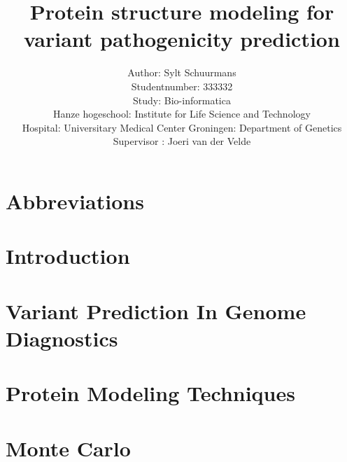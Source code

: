 \documentclass[10pt]{article}
\begin{document}
	\title{Protein structure modeling for variant pathogenicity prediction}
	\author{Author: Sylt Schuurmans\\
		Studentnumber: 333332\\
		Study: Bio-informatica\\
		Hanze hogeschool: Institute for Life Science and Technology\\
		Hospital: Universitary Medical Center Groningen: Department of Genetics\\
		Supervisor : Joeri van der Velde}
	\maketitle
	\newpage
	
	
	
	\tableofcontents
	\newpage
	
	\listoffigures
	\newpage
	
	\section*{Abbreviations}
	
	\label{section:Chap_Abbreviations}
	\newpage
	
	\section*{Introduction}
	
	\label{section:Chap_Introduction}
	\newpage
	
	
	\section{Variant Prediction In Genome Diagnostics}
	
	\label{section:Chap_Variant_Prediction_In_Genome_Diagnostics}
	\newpage
		
	\section{Protein Modeling Techniques}
	
	\label{section:Chap_Protein_Modeling_Techniques}
	\newpage
	
	\section{Monte Carlo}
	
	\label{section:Chap_Monte_Carlo}
	\newpage
	
\end{document}
